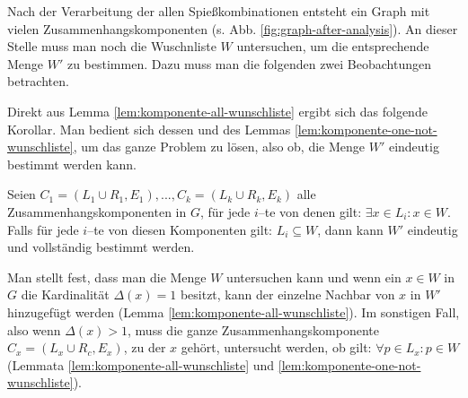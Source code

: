 \begin{comment}
\begin{lemma}\label{lem:grad-groesser1}
Seien $x \in A$ ein Knoten in $G$ und seine Kardinalität $\Delta(x) = k > 1$.
Dann gehört $x$ zu einer Zusammenhangskomponente $C = (V_c, E_c)$, wobei
die Menge $V_c$ aus insgesamt $2k$ Knoten $x_1, ..., x_k \in A$ 
und $y_1, ..., y_k \in B$ besteht. Für die Menge $E_c$ gilt:
$E_c = (A \setminus V_c) \times (B \setminus V_c) $.
$C$ ist deshalb selbt ein vollständiger, bipartiter Graph.
\end{lemma}
\begin{proof}
Der Beweis erfolgt durch Widerspruch.
\TODO{Beweis} 
\end{proof}
\end{comment}




Nach der Verarbeitung der allen Spießkombinationen entsteht ein Graph mit vielen Zusammenhangskomponenten
(s. Abb. \ref{fig:graph-after-analysis}).
An dieser Stelle muss man noch die Wuschnliste $W$ untersuchen, um die entsprechende Menge $W'$ zu bestimmen.
Dazu muss man die folgenden zwei Beobachtungen betrachten.





Direkt aus Lemma \ref{lem:komponente-all-wunschliste} ergibt sich das folgende Korollar.
Man bedient sich dessen und des Lemmas \ref{lem:komponente-one-not-wunschliste}, um das ganze Problem zu lösen, also ob, die Menge $W'$ eindeutig bestimmt werden kann.

\begin{korollar}
Seien $C_1 = (L_1 \cup R_1, E_1), ..., C_k = (L_k \cup R_k, E_k)$ alle Zusammenhangskomponenten in $G$,
für jede $i$--te von denen gilt: $\exists x \in L_i : x \in W$.
Falls für jede $i$--te von diesen Komponenten gilt: $L_i \subseteq W$, dann
kann $W'$ eindeutig und vollständig bestimmt werden.
\end{korollar}

Man stellt fest, dass man die Menge $W$ untersuchen kann und wenn ein $x \in W$ in $G$ die
Kardinalität $\Delta(x) = 1$ besitzt, kann der einzelne Nachbar von $x$ in $W'$ hinzugefügt werden
(Lemma \ref{lem:komponente-all-wunschliste}).
Im sonstigen Fall, also wenn $\Delta(x) > 1$, muss die ganze Zusammenhangskomponente
$C_x = (L_x \cup R_c, E_x)$, zu der $x$ gehört, untersucht werden, ob gilt: $\forall p \in L_x: p \in W$
(Lemmata \ref{lem:komponente-all-wunschliste} und \ref{lem:komponente-one-not-wunschliste}).\\


